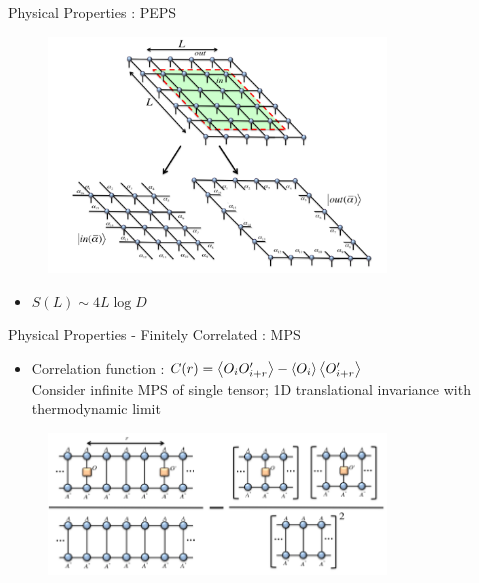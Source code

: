 \documentclass{beamer}
\begin{document}
\begin{frame}{Physical Properties : PEPS}
	\begin{figure}[h]
	\includegraphics[width=0.8\textwidth]{peps}
	\centering
	\end{figure}
	\begin{itemize}
	\item ${ S(L)\sim 4L\log{D} }$
	\end{itemize}
\end{frame}


\begin{frame}{Physical Properties - Finitely Correlated : MPS}
\begin{itemize}
	\item Correlation function : ${ C(r)=\ev{O_{i}O^{\prime}_{i+r}} - \ev{O_{i}}\ev{O^{\prime}_{i+r}} }$\\
		Consider infinite MPS of single tensor; 1D translational invariance with thermodynamic limit
\end{itemize}	
	\begin{figure}[h]
	\includegraphics[width=0.8\textwidth]{corr}
	\centering
	\end{figure}
\end{frame}
\end{document}
